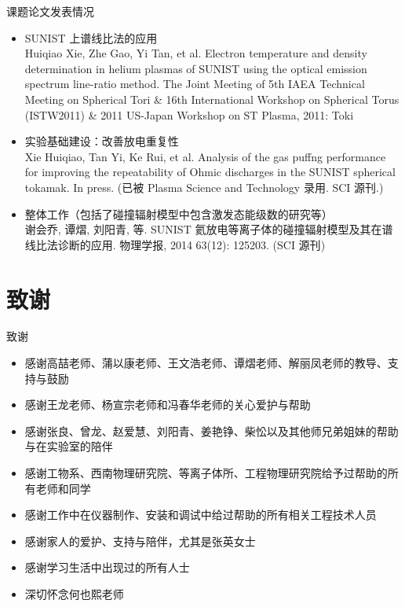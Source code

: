 \begin{frame}{课题论文发表情况}
	\small{
	\begin{itemize}
		\item SUNIST 上谱线比法的应用\\
			{\tiny Huiqiao Xie, Zhe Gao, Yi Tan, et al. Electron temperature and density determination in helium plasmas of SUNIST using the optical emission spectrum line-ratio method. The Joint Meeting of 5th IAEA Technical Meeting on Spherical Tori \& 16th International Workshop on Spherical Torus (\alert{ISTW2011}) \& 2011 US-Japan Workshop on ST Plasma, 2011: Toki}
		\item 实验基础建设：改善放电重复性\\
			{\tiny Xie Huiqiao, Tan Yi, Ke Rui, et al. Analysis of the gas puffng performance for improving the repeatability of Ohmic discharges in the SUNIST spherical tokamak. In press. (\alert{已被 Plasma Science and Technology 录用. SCI 源刊.})}
		\item 整体工作（包括了碰撞辐射模型中包含激发态能级数的研究等）\\
			{\tiny 谢会乔, 谭熠, 刘阳青, 等. SUNIST 氦放电等离子体的碰撞辐射模型及其在谱线比法诊断的应用. 物理学报, 2014 63(12): 125203. (\alert{SCI 源刊})} %
	\end{itemize}
	}
\end{frame}

\section{致谢}
\begin{frame}{致谢}
	\begin{itemize}
		\item 感谢高喆老师、蒲以康老师、王文浩老师、谭熠老师、解丽凤老师的教导、支持与鼓励
		\item 感谢王龙老师、杨宣宗老师和冯春华老师的关心爱护与帮助
		\item 感谢张良、曾龙、赵爱慧、刘阳青、姜艳铮、柴忪以及其他师兄弟姐妹的帮助与在实验室的陪伴
		\item 感谢工物系、西南物理研究院、等离子体所、工程物理研究院给予过帮助的所有老师和同学
		\item 感谢工作中在仪器制作、安装和调试中给过帮助的所有相关工程技术人员
		\item 感谢家人的爱护、支持与陪伴，尤其是张英女士
		\item 感谢学习生活中出现过的所有人士
		\item 深切怀念何也熙老师
	\end{itemize}
\end{frame}
\appendix

